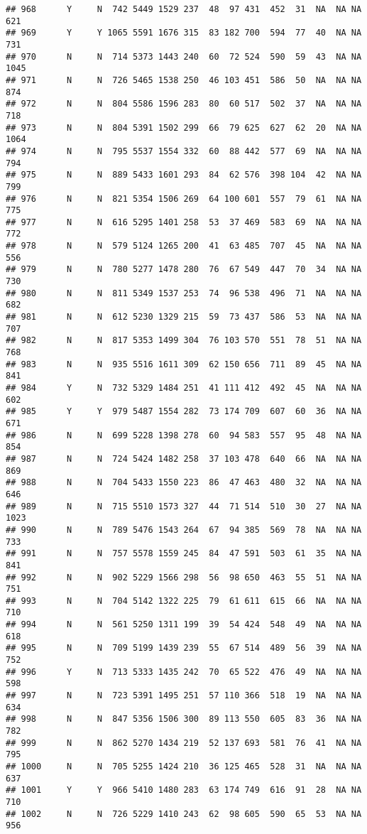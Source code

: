 \documentclass[]{article}
\begin{document}
\begin{verbatim}
## 968      Y     N  742 5449 1529 237  48  97 431  452  31  NA  NA NA  621
## 969      Y     Y 1065 5591 1676 315  83 182 700  594  77  40  NA NA  731
## 970      N     N  714 5373 1443 240  60  72 524  590  59  43  NA NA 1045
## 971      N     N  726 5465 1538 250  46 103 451  586  50  NA  NA NA  874
## 972      N     N  804 5586 1596 283  80  60 517  502  37  NA  NA NA  718
## 973      N     N  804 5391 1502 299  66  79 625  627  62  20  NA NA 1064
## 974      N     N  795 5537 1554 332  60  88 442  577  69  NA  NA NA  794
## 975      N     N  889 5433 1601 293  84  62 576  398 104  42  NA NA  799
## 976      N     N  821 5354 1506 269  64 100 601  557  79  61  NA NA  775
## 977      N     N  616 5295 1401 258  53  37 469  583  69  NA  NA NA  772
## 978      N     N  579 5124 1265 200  41  63 485  707  45  NA  NA NA  556
## 979      N     N  780 5277 1478 280  76  67 549  447  70  34  NA NA  730
## 980      N     N  811 5349 1537 253  74  96 538  496  71  NA  NA NA  682
## 981      N     N  612 5230 1329 215  59  73 437  586  53  NA  NA NA  707
## 982      N     N  817 5353 1499 304  76 103 570  551  78  51  NA NA  768
## 983      N     N  935 5516 1611 309  62 150 656  711  89  45  NA NA  841
## 984      Y     N  732 5329 1484 251  41 111 412  492  45  NA  NA NA  602
## 985      Y     Y  979 5487 1554 282  73 174 709  607  60  36  NA NA  671
## 986      N     N  699 5228 1398 278  60  94 583  557  95  48  NA NA  854
## 987      N     N  724 5424 1482 258  37 103 478  640  66  NA  NA NA  869
## 988      N     N  704 5433 1550 223  86  47 463  480  32  NA  NA NA  646
## 989      N     N  715 5510 1573 327  44  71 514  510  30  27  NA NA 1023
## 990      N     N  789 5476 1543 264  67  94 385  569  78  NA  NA NA  733
## 991      N     N  757 5578 1559 245  84  47 591  503  61  35  NA NA  841
## 992      N     N  902 5229 1566 298  56  98 650  463  55  51  NA NA  751
## 993      N     N  704 5142 1322 225  79  61 611  615  66  NA  NA NA  710
## 994      N     N  561 5250 1311 199  39  54 424  548  49  NA  NA NA  618
## 995      N     N  709 5199 1439 239  55  67 514  489  56  39  NA NA  752
## 996      Y     N  713 5333 1435 242  70  65 522  476  49  NA  NA NA  598
## 997      N     N  723 5391 1495 251  57 110 366  518  19  NA  NA NA  634
## 998      N     N  847 5356 1506 300  89 113 550  605  83  36  NA NA  782
## 999      N     N  862 5270 1434 219  52 137 693  581  76  41  NA NA  795
## 1000     N     N  705 5255 1424 210  36 125 465  528  31  NA  NA NA  637
## 1001     Y     Y  966 5410 1480 283  63 174 749  616  91  28  NA NA  710
## 1002     N     N  726 5229 1410 243  62  98 605  590  65  53  NA NA  956

\end{verbatim}
\end{document}
